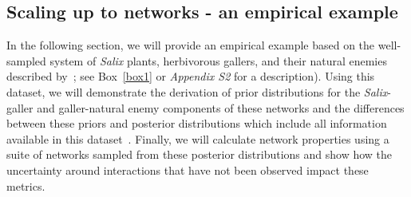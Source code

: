 \documentclass[12pt]{article}
\begin{document}
\begin{spacing}{2.0}
\section*{Scaling up to networks - an empirical example}


    In the following section, we will provide an empirical example based on the well-sampled system of \emph{Salix}  plants, herbivorous gallers, and their natural enemies described by~\citet{Kopelke2017}; see Box~\ref{box1} or \emph{Appendix S2} for a description). Using this dataset, we will demonstrate the derivation of prior distributions for the \emph{Salix}-galler and galler-natural enemy components of these networks and the differences between these priors and posterior distributions which include all information available in this dataset~\citep{Kopelke2017}. Finally, we will calculate network properties using a suite of networks sampled from these posterior distributions and show how the uncertainty around interactions that have not been observed impact these metrics. %


\end{spacing}
\end{document}

